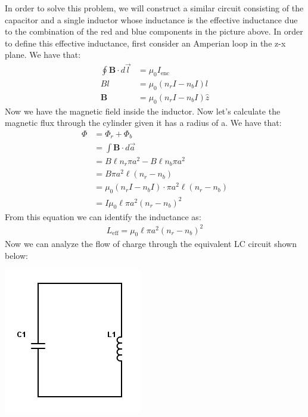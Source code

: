 \documentclass[a4paper, 11pt]{article}
\begin{document}
\noindent In order to solve this problem, we will construct a similar circuit consisting of the capacitor and a single inductor whose inductance is the effective inductance due to the combination of the red and blue components in the picture above. In order to define this effective inductance, first consider an Amperian loop in the z-x plane. We have that: 
	\begin{align*}
		\oint \mathbf{B} \cdot d\vec{l} &= \mu_0 I_{\text{enc}} \\ 
		B l &= \mu_0(n_rI - n_bI)l \\ 
		\mathbf{B} &= \mu_0(n_rI-n_bI) \hat{z} 
	\end{align*}
Now we have the magnetic field inside the inductor. Now let's calculate the magnetic flux through the cylinder given it has a radius of a. We have that: 
	\begin{align*}
		\Phi 	&= \Phi_r + \Phi_b\\ 
				&= \int \mathbf{B} \cdot d\vec{a}  \\ 
				&= B\ell n_r\pi a^2 - B \ell n_b\pi a^2 \\ 
				&= B\pi a^2 \ell(n_r-n_b) \\ 
				&= \mu_0(n_rI-n_bI) \cdot \pi a^2\ell(n_r-n_b) \\ 
				&= I \mu_0 \ell \pi a^2 (n_r - n_b)^2 
	\end{align*}
From this equation we can identify the inductance as: 
	\begin{eqnarray}
		L_{\text{eff}} = \mu_0 \ell \pi a^2 (n_r - n_b)^2
	\end{eqnarray}
Now we can analyze the flow of charge through the equivalent LC circuit shown below: 
	\begin{center}
		\includegraphics[scale=0.5]{circuit2}
	\end{center}
\end{document}
